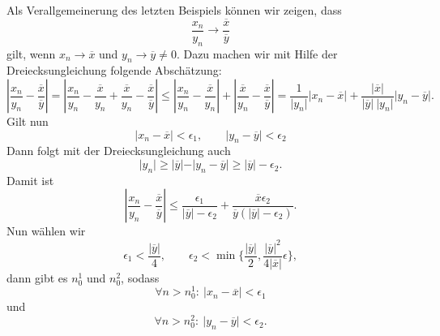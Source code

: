 Als Verallgemeinerung des letzten Beispiels können wir zeigen, dass
\begin{equation*}
 \frac{x_n}{y_n} \rightarrow \frac{\overline{x}}{\overline{y}}\end{equation*}
gilt, wenn \(x_n \rightarrow \overline{x}\) und \(y_n \rightarrow \overline{y} \neq 0\). Dazu machen wir mit Hilfe der Dreiecksungleichung folgende Abschätzung:
\begin{equation*}
\left\vert \frac{x_n}{y_n} -\frac{\overline{x}}{\overline{y}} \right\vert =
\left\vert \frac{x_n}{y_n} -\frac{\overline{x}}{y_n}+\frac{\overline{x}}{y_n}-\frac{\overline{x}}{\overline{y}} \right\vert \leq 
\left\vert \frac{x_n}{y_n} -\frac{\overline{x}}{y_n}\right\vert+\left\vert\frac{\overline{x}}{y_n}-\frac{\overline{x}}{\overline{y}} \right\vert = \frac{1}{\vert y_n \vert} \vert x_n - \overline{x}\vert+
\frac{\vert \overline{x} \vert}{\vert \overline{y} \vert~\vert y_n \vert} \vert y_n - \overline{y}\vert.
\end{equation*}
Gilt nun
\begin{equation*}
  \vert x_n - \overline{x}\vert < \epsilon_1, \qquad  \vert y_n - \overline{y}\vert < \epsilon_2\end{equation*}
Dann folgt mit der Dreiecksungleichung auch
\begin{equation*}
 \vert y_n \vert \geq \vert \overline{y}\vert - \vert y_n - \overline{y}\vert \geq \vert \overline{y}\vert - \epsilon_2 .\end{equation*}
Damit ist
\begin{equation*}
 \left\vert \frac{x_n}{y_n} -\frac{\overline{x}}{\overline{y}} \right\vert \leq \frac{\epsilon_1}{\vert \overline{y} \vert - \epsilon_2} + \frac{\overline{x}\epsilon_2}{\overline{y}(\vert \overline{y} \vert - \epsilon_2)}  .\end{equation*}
Nun wählen wir
\begin{equation*}
 \epsilon_1 <\frac{\vert \overline{y} \vert }4,  \qquad \epsilon_2 < \min\{\frac{\vert \overline{y} \vert }2, \frac{\vert \overline{y} \vert^2}{4 \vert \overline{x} \vert} \epsilon \} ,\end{equation*}
dann gibt es \(n_0^1\) und \(n_0^2\), sodass
\begin{equation*}
 \forall n > n_0^1:~\vert x_n - \overline{x} \vert < \epsilon_1\end{equation*}
und
\begin{equation*}
 \forall n > n_0^2:~\vert y_n - \overline{y} \vert < \epsilon_2 .
\end{equation*}
